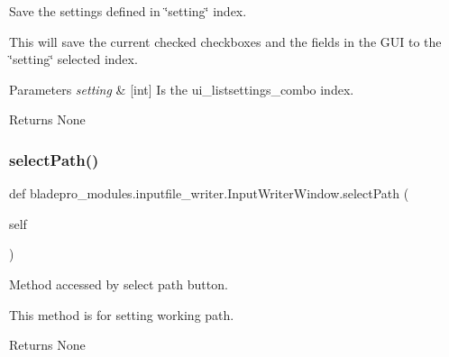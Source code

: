 Save the settings defined in \char`\"{}setting\char`\"{} index. 

This will save the current checked checkboxes and the fields in the G\+UI to the \char`\"{}setting\char`\"{} selected index.


\begin{DoxyParams}{Parameters}
{\em setting} & \mbox{[}int\mbox{]} Is the ui\+\_\+listsettings\+\_\+combo index. \\
\hline
\end{DoxyParams}
\begin{DoxyReturn}{Returns}
None 
\end{DoxyReturn}
\hypertarget{classbladepro__modules_1_1inputfile__writer_1_1_input_writer_window_a15eb2b878a78d644c96b19a5785d5428}{}\label{classbladepro__modules_1_1inputfile__writer_1_1_input_writer_window_a15eb2b878a78d644c96b19a5785d5428} 
\subsubsection{\texorpdfstring{select\+Path()}{selectPath()}}
{\footnotesize\ttfamily def bladepro\+\_\+modules.\+inputfile\+\_\+writer.\+Input\+Writer\+Window.\+select\+Path (\begin{DoxyParamCaption}\item[{}]{self }\end{DoxyParamCaption})}



Method accessed by select path button. 

This method is for setting working path.

\begin{DoxyReturn}{Returns}
None 
\end{DoxyReturn}
\hypertarget{classbladepro__modules_1_1inputfile__writer_1_1_input_writer_window_a1b508dd4cb9c699a1769e7727d1e6fc1}{}\label{classbladepro__modules_1_1inputfile__writer_1_1_input_writer_window_a1b508dd4cb9c699a1769e7727d1e6fc1} 
